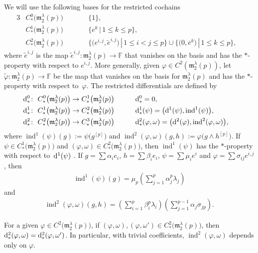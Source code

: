 \documentclass[10pt,a4paper]{amsart}
\def\ind{\operatorname{ind}}
\def\phi{\varphi}
\def\m{\mathfrak m}
\def\F{\mathbb F}
\numberwithin{equation}{section}
\begin{document}
We will use the following bases for the restricted cochains
\begin{alignat*}{3}
& C^0_*\big(\m_2^\lambda(p)\big) \qquad && \{1\},&\\
& C^1_*\big(\m_2^\lambda(p)\big)\qquad & & \big\{e^k\, |\, 1\le k\le p\big\},&\\
& C^2_*\big(\m_2^\lambda(p)\big)\qquad & & \big\{\big(e^{i,j},\tilde e^{i,j}\big)\, |\, 1\le i<j\le p\big\}\cup \big\{\big(0,\overline e^k\big)\, |\, 1\le k\le p\big\},&
\end{alignat*}
where $\tilde e^{i,j}$ is the map $\tilde e^{i,j}\colon \m_2^\lambda(p)\to \F$ that vanishes on the basis and has the $*$-property with respect to $e^{i,j}$. More generally, given $\phi\in C^2(\m_2^\lambda(p))$, let $\tilde\phi\colon \m_2^\lambda(p) \to\F$ be the map that vanishes on the basis for $\m_2^\lambda(p) $ and has the $*$-property with respect to~$\phi$. The restricted differentials are defined by
\begin{alignat*}{3}
& {\rm d}^0_*\colon \ C^0_*\big(\m_2^\lambda(p)\big)\to C^1_*\big(\m_2^\lambda(p)\big) \qquad && {\rm d}^0_*=0,&\\
& {\rm d}^1_*\colon \ C^1_*\big(\m_2^\lambda(p)\big)\to C^2_*\big(\m_2^\lambda(p)\big) \qquad && {\rm d}^1_*(\psi)=\big({\rm d}^1(\psi),\ind^1(\psi)\big),&\\
& {\rm d}^2_*\colon \ C^2_*\big(\m_2^\lambda(p)\big)\to C^3_*\big(\m_2^\lambda(p)\big) \qquad && {\rm d}^2_*(\phi,\omega)=\big({\rm d}^2(\phi),\ind^2(\phi,\omega)\big),&
\end{alignat*}
where $\ind^1(\psi)(g) := \psi\big(g^{[p]}\big)$ and $\ind^2(\phi,\omega)(g,h) := \phi\big(g\wedge h^{[p]}\big)$. If $\psi\in C^1_*\big(\m_2^\lambda(p)\big)$ and $(\phi,\omega)\in C^2_*\big(\m_2^\lambda(p)\big)$, then $\ind^1(\psi)$ has the $*$-property with respect to~${\rm d}^1(\psi)$ \cite[Lemma~4]{EvansFuchs2008}. If $g=\sum\alpha_i e_i$, $h=\sum\beta_i e_i$, $\psi=\sum \mu_ie^i$ and $\phi=\sum \sigma_{ij}e^{i,j}$, then
\begin{gather*}%
 \ind^1(\psi)(g) = \mu_p \left (\sum_{j=1}^p \alpha_j^p\lambda_j \right )
\end{gather*}
and
\begin{gather}\label{induced2}
 \ind^2(\phi,\omega)(g,h) = \left (\sum_{i=1}^p \beta_i^p\lambda_i \right )\left (\sum_{j=1}^{p-1} \alpha_j\sigma_{jp}\right).
\end{gather}

\begin{Remark}\label{changecomp2}
 For a given $\phi\in C^2\big(\m_2^\lambda(p)\big)$, if $(\phi,\omega),(\phi,\omega')\in C^2_*\big(\m_2^\lambda(p)\big)$, then ${\rm d}^2_*(\phi,\omega)={\rm d}^2_*(\phi,\omega')$. In particular, with trivial coefficients, $\ind^2(\phi,\omega)$ depends only on $\phi$.
\end{Remark}
\end{document}
